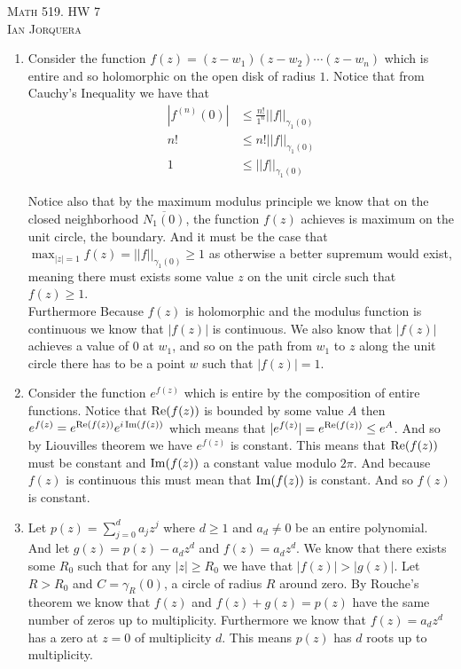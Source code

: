 \documentclass[12pt]{amsart}
\begin{document}
\begin{center}
    \textsc{Math 519. HW 7\\ Ian Jorquera}
\end{center}
\vspace{1em}

\begin{enumerate}
\item Consider the function $f(z)=(z-w_1)(z-w_2)\cdots (z-w_n)$ which is entire and so holomorphic on the open disk of radius $1$. Notice that from Cauchy's Inequality we have that
    \begin{align*}
        |f^{(n)}(0)|&\leq \frac{n!}{1^n}||f||_{\gamma_1(0)}\\
        n! &\leq n!||f||_{\gamma_1(0)}\\
        1 &\leq ||f||_{\gamma_1(0)}
    \end{align*}

     Notice also that by the maximum modulus principle we know that on the closed neighborhood $\overline{N_1(0)}$, the function $f(z)$ achieves is maximum on the unit circle, the boundary. And it must be the case that $\max_{|z|=1}f(z)=||f||_{\gamma_1(0)}\geq 1$ as otherwise a better supremum would exist, meaning there must exists some value $z$ on the unit circle such that $f(z)\geq 1$.\\

     Furthermore Because $f(z)$ is holomorphic and the modulus function is continuous we know that $|f(z)|$ is continuous. We also know that $|f(z)|$ achieves a value of $0$ at $w_1$, and so on the path from $w_1$ to $z$ along the unit circle there has to be a point $w$ such that $|f(z)|=1$.\\

    
    \item %
    Consider the function $e^{f(z)}$ which is entire by the composition of entire functions. Notice that $\operatorname{\mathrm{Re}}(f(z))$ is bounded by some value $A$ then $e^{f(z)}=e^{\operatorname{\mathrm{Re}}(f(z))}e^{i\operatorname{\mathrm{Im}}(f(z))}$ which means that $|e^{f(z)}|=e^{\operatorname{\mathrm{Re}}(f(z))}\leq e^A$. And so by Liouvilles theorem we have $e^{f(z)}$ is constant. This means that $\operatorname{\mathrm{Re}}(f(z))$ must be constant and $\operatorname{\mathrm{Im}}(f(z))$ a constant value modulo $2\pi$. And because $f(z)$ is continuous this must mean that $\operatorname{\mathrm{Im}}(f(z))$ is constant. And so $f(z)$ is constant.\\
    
\item Let $p(z)=\sum_{j=0}^{d}a_j z^j$ where $d\geq 1$ and $a_d\neq 0$ be an entire polynomial. And let $g(z)=p(z)-a_dz^d$ and $f(z)=a_dz^d$. We know that there exists some $R_0$ such that for any $|z|\geq R_0$ we have that $|f(z)|>|g(z)|$. Let $R>R_0$ and $C=\gamma_R(0)$, a circle of radius $R$ around zero. By Rouche's theorem we know that $f(z)$ and $f(z)+g(z)=p(z)$ have the same number of zeros up to multiplicity. Furthermore we know that $f(z)=a_dz^d$ has a zero at $z=0$ of multiplicity $d$. This means $p(z)$ has $d$ roots up to multiplicity.\\


\end{enumerate}
\end{document}
